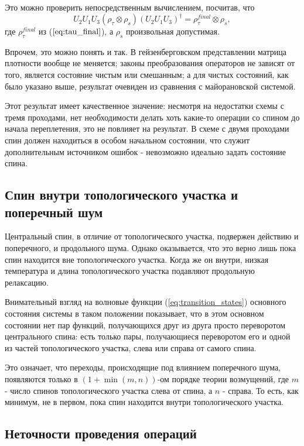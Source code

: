 \documentclass[a4paper,12pt]{article}
\theoremstyle{plain} %
\theoremstyle{definition} %
\theoremstyle{remark} %
\begin{document}
Это можно проверить непосредственным вычислением, посчитав, что
\begin{equation}
    U_2 U_1 U_3 (\rho_\tau \otimes \rho_s) (U_2 U_1 U_3)^\dagger = \rho^{final}_\tau \otimes \rho_s
    \label{eq:u213_general},
\end{equation}
где $\rho^{final}_\tau$ из ($\ref{eq:tau_final}$), а $\rho_s$ произвольная допустимая.

Впрочем, это можно понять и так. В гейзенберговском представлении матрица плотности вообще не меняется; законы преобразования операторов не зависят от того, является состояние чистым или смешанным; а для чистых состояний, как было указано выше, результат очевиден из сравнения с майорановской системой.

Этот результат имеет качественное значение: несмотря на недостатки схемы с тремя проходами, нет необходимости делать хоть какие-то операции со спином до начала переплетения, это не повлияет на результат. 
В схеме с двумя проходами спин должен находиться в особом начальном состоянии, что служит дополнительным источником ошибок - невозможно идеально задать состояние спина.

\subsection{Спин внутри топологического участка и поперечный шум} \label{subsec:inside_transverse}

Центральный спин, в отличие от топологического участка, подвержен действию и поперечного, и продольного шума. 
Однако оказывается, что это верно лишь пока спин находится вне топологического участка.
Когда же он внутри, низкая температура и длина топологического участка подавляют продольную релаксацию.

Внимательный взгляд на волновые функции (\ref{eq:transition_states}) основного состояния системы в таком положении показывает, что в этом основном состоянии нет пар функций, получающихся друг из друга просто переворотом центрального спина: есть только пары, получающиеся переворотом его и одной из частей топологического участка, слева или справа от самого спина.

Это означает, что переходы, происходящие под влиянием поперечного шума, появляются только в $(1 + \min(m,n))$-ом порядке теории возмущений, где $m$ - число спинов топологического участка слева от спина, а $n$ - справа. 
То есть, как минимум, не в первом, пока спин находится внутри топологического участка.

\subsection{Неточности проведения операций}
\end{document}
